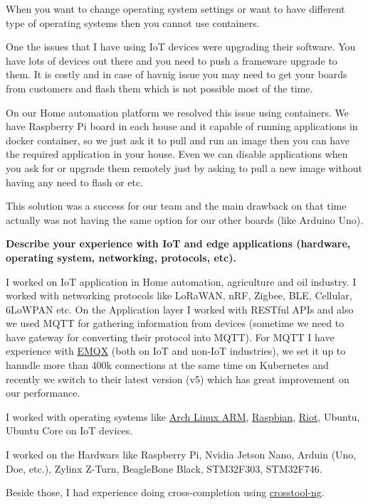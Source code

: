 When you want to change operating system settings or want to have different type of operating systems then you cannot
use containers.

One the issues that I have using IoT devices were upgrading their software. You have lots of devices out there
and you need to push a frameware upgrade to them. It is costly and in case of havnig issue you may need to get
your boards from customers and flash them which is not possible most of the time.

On our Home automation platform we resolved this issue using containers. We have Raspberry Pi board in each house
and it capable of running applications in docker container, so we just ask it to pull and run an image then
you can have the required application in your house. Even we can disable applications when you ask for or upgrade
them remotely just by asking to pull a new image without having any need to flash or etc.

This solution was a success for our team and the main drawback on that time actually was not having the same
option for our other boards (like Arduino Uno).

\noindent
\textbf{Describe your experience with IoT and edge applications (hardware, operating system, networking, protocols, etc).}

I worked on IoT application in Home automation, agriculture and oil industry. I worked with networking protocols
like LoRaWAN, nRF, Zigbee, BLE, Cellular, 6LoWPAN etc.
On the Application layer I worked with RESTful APIs and also we used MQTT for gathering information from devices
(sometime we need to have gateway for converting their protocol into MQTT). For MQTT I have experience with
\href{https://github.com/emqx/emqx}{EMQX} (both on IoT and non-IoT industries), we set it up to hanndle more than 400k connections
at the same time on Kubernetes and recently we switch to their latest version (v5) which has great improvement on our performance.

I worked with operating systems like \href{https://archlinuxarm.org/}{Arch Linux ARM}, \href{https://www.raspbian.org/}{Raspbian},
\href{https://www.riot-os.org/}{Riot}, Ubuntu, Ubuntu Core on IoT devices.

I worked on the Hardwars like Raspberry Pi, Nvidia Jetson Nano, Arduin (Uno, Doe, etc.), Zylinx Z-Turn, BeagleBone Black,
STM32F303, STM32F746.

Beside those, I had experience doing cross-completion using \href{https://github.com/crosstool-ng/crosstool-ng}{crosstool-ng}.

